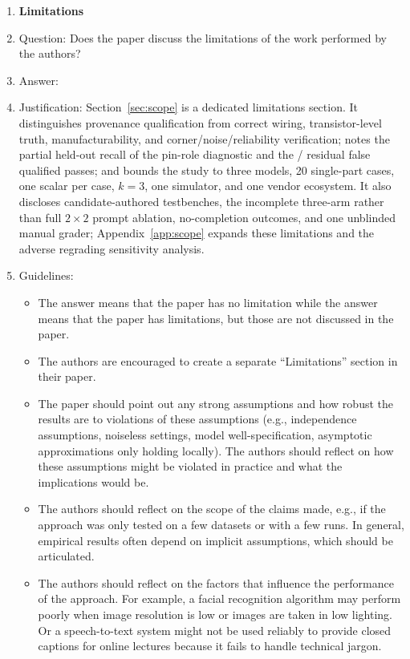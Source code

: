 \begin{enumerate}
\item {\bf Limitations}
    \item[] Question: Does the paper discuss the limitations of the work performed by the authors?
    \item[] Answer: \answerYes{}
    \item[] Justification: Section~\ref{sec:scope} is a dedicated limitations section. It distinguishes provenance qualification from correct wiring, transistor-level truth, manufacturability, and corner/noise/reliability verification; notes the partial held-out recall of the pin-role diagnostic and the \ProvFN{}/\StageProvAccepted{} residual false qualified passes; and bounds the study to three models, 20 single-part cases, one scalar per case, $k=3$, one simulator, and one vendor ecosystem. It also discloses candidate-authored testbenches, the incomplete three-arm rather than full $2\times2$ prompt ablation, no-completion outcomes, and one unblinded manual grader; Appendix~\ref{app:scope} expands these limitations and the adverse regrading sensitivity analysis.
    \item[] Guidelines:
    \begin{itemize}
        \item The answer \answerNA{} means that the paper has no limitation while the answer \answerNo{} means that the paper has limitations, but those are not discussed in the paper. 
        \item The authors are encouraged to create a separate ``Limitations'' section in their paper.
        \item The paper should point out any strong assumptions and how robust the results are to violations of these assumptions (e.g., independence assumptions, noiseless settings, model well-specification, asymptotic approximations only holding locally). The authors should reflect on how these assumptions might be violated in practice and what the implications would be.
        \item The authors should reflect on the scope of the claims made, e.g., if the approach was only tested on a few datasets or with a few runs. In general, empirical results often depend on implicit assumptions, which should be articulated.
        \item The authors should reflect on the factors that influence the performance of the approach. For example, a facial recognition algorithm may perform poorly when image resolution is low or images are taken in low lighting. Or a speech-to-text system might not be used reliably to provide closed captions for online lectures because it fails to handle technical jargon.

\end{itemize}
\end{enumerate}
